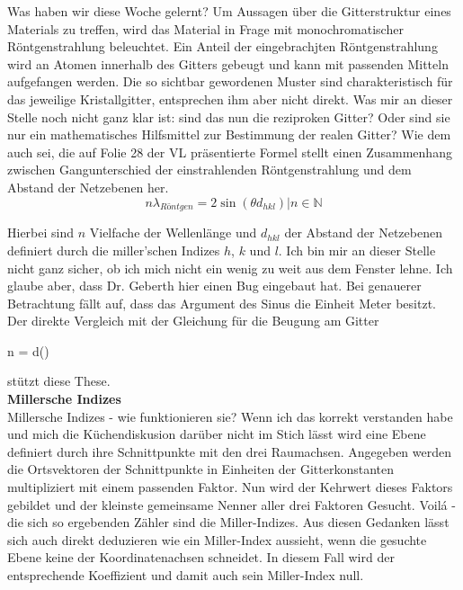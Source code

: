 Was haben wir diese Woche gelernt? Um Aussagen über die Gitterstruktur eines Materials zu treffen, wird das Material in Frage mit monochromatischer
Röntgenstrahlung beleuchtet. Ein Anteil der eingebrachjten Röntgenstrahlung wird an Atomen innerhalb des Gitters gebeugt und kann mit passenden
Mitteln aufgefangen werden. Die so sichtbar gewordenen Muster sind charakteristisch für das jeweilige Kristallgitter, entsprechen ihm aber nicht
direkt. Was mir an dieser Stelle noch nicht ganz klar ist: sind das nun die reziproken Gitter? Oder sind sie nur ein mathematisches Hilfsmittel
zur Bestimmung der realen Gitter? Wie dem auch sei, die auf Folie 28 der VL präsentierte Formel stellt einen Zusammenhang zwischen Gangunterschied
der einstrahlenden Röntgenstrahlung und dem Abstand der Netzebenen her.
\begin{equation}
    n\lambda_{Röntgen} = 2\sin(\theta d_{hkl}) \vert n \in \mathbb{N}
    \label{eq:eq1}
\end{equation}

Hierbei sind \(n\) Vielfache der Wellenlänge und \(d_{hkl}\) der Abstand der Netzebenen definiert durch die miller'schen Indizes \(h\), \(k\) und \(l\).
Ich bin mir an dieser Stelle nicht ganz sicher, ob ich mich nicht ein wenig zu weit aus dem Fenster lehne. Ich glaube aber, dass Dr. Geberth hier einen
Bug eingebaut hat. Bei genauerer Betrachtung fällt auf, dass das Argument des Sinus die Einheit Meter besitzt. Der direkte Vergleich mit der Gleichung für
die Beugung am Gitter

\be
    n \lambda = d\sin(\alpha)
    \label{eq:eq2}
\ee

stützt diese These.\\

\textbf{Millersche Indizes}\\
Millersche Indizes - wie funktionieren sie? Wenn ich das korrekt verstanden habe und mich die Küchendiskusion darüber nicht im Stich lässt wird eine Ebene
definiert durch ihre Schnittpunkte mit den drei Raumachsen. Angegeben werden die Ortsvektoren der Schnittpunkte in Einheiten der Gitterkonstanten multipliziert
mit einem passenden Faktor. Nun wird der Kehrwert dieses Faktors gebildet und der kleinste gemeinsame Nenner aller drei Faktoren Gesucht. Voilá - die sich so
ergebenden Zähler sind die Miller-Indizes. Aus diesen Gedanken lässt sich auch direkt deduzieren wie ein Miller-Index aussieht, wenn die gesuchte Ebene keine
der Koordinatenachsen schneidet. In diesem Fall wird der entsprechende Koeffizient und damit auch sein Miller-Index null.\\


